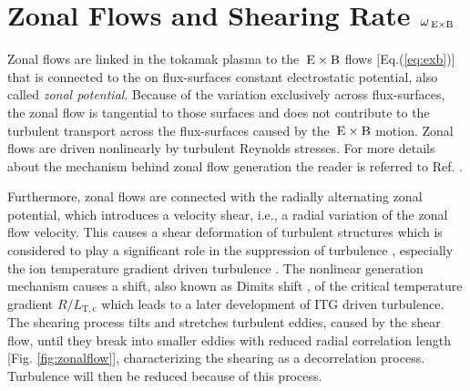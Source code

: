 \section{Zonal Flows and Shearing Rate {\boldmath $\omega_{\mathrm{\:E \times B}}$}}
\label{sec:zonalflow}

Zonal flows are linked in the tokamak plasma to the $\mathrm{\:E}\times\mathrm{B}$ flows [Eq.(\ref{eq:exb})] that is connected to the on flux-surfaces constant electrostatic potential, also called \textit{zonal potential}. \cite{Diamond2005} Because of the variation exclusively across flux-surfaces, the zonal flow is tangential to those surfaces and does not contribute to the turbulent transport across the flux-surfaces caused by the $\mathrm{\:E}\times\mathrm{B}$ motion. 
Zonal flows are driven nonlinearly by turbulent Reynolds stresses. \cite{Diamond1991} For more details about the mechanism behind zonal flow generation the reader is referred to Ref. . \bigskip


Furthermore, zonal flows are connected with the radially alternating zonal potential, which introduces a velocity shear, i.e., a radial variation of the zonal flow velocity. This causes a shear deformation of turbulent structures which is considered to play a significant role in the suppression of turbulence \cite{Biglari1990, Dimits2000}, especially the ion temperature gradient driven turbulence \cite{Nakata2012, Makwana2014, Maeyama2014, Whelan2018, Whelan2019}. The nonlinear generation mechanism causes a shift, also known as Dimits shift \cite{Dimits2000}, of the critical temperature gradient $R/L_\mathrm{T,c}$ which leads to a later development of ITG driven turbulence. The shearing process tilts and stretches turbulent eddies, caused by the shear flow, until they break into smaller eddies with reduced radial correlation length [Fig. \ref{fig:zonalflow}],  characterizing the shearing as a decorrelation process. Turbulence will then be reduced because of this process. \cite{Biglari1990,Diamond2005,Burnell1997} \bigskip

\newpage

